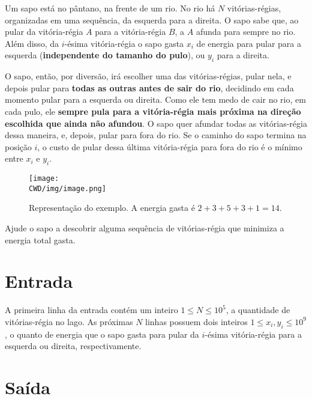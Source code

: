 %

Um sapo está no pântano, na frente de um rio. No rio há $N$ vitórias-régias, organizadas em uma sequência, da esquerda para a direita. O sapo sabe que, ao pular da vitória-régia $A$ para a vitória-régia $B$, a $A$ afunda para sempre no rio. Além disso, da $i$-ésima vitória-régia o sapo gasta $x_i$ de energia para pular para a esquerda (\textbf{independente do tamanho do pulo}), ou $y_i$ para a direita.

O sapo, então, por diversão, irá escolher uma das vitórias-régias, pular nela, e depois pular para \textbf{todas as outras antes de sair do rio}, decidindo em cada momento pular para a esquerda ou direita. Como ele tem medo de cair no rio, em cada pulo, ele \textbf{sempre pula para a vitória-régia mais próxima na direção escolhida que ainda não afundou}. O sapo quer afundar todas as vitórias-régia dessa maneira, e, depois, pular para fora do rio. Se o caminho do sapo termina na posição $i$, o custo de pular dessa última vitória-régia para fora do rio é o mínimo entre $x_i$ e $y_i$.

\begin{figure}[H]
  \centering
  \texttt{[image: \\CWD/img/image.png]}
  \caption{Representação do exemplo. A energia gasta é $2+3+5+3+1=14$.}
\end{figure}

Ajude o sapo a descobrir alguma sequência de vitórias-régia que minimiza a energia total gasta.

%
%

\section*{Entrada}

A primeira linha da entrada contém um inteiro $1 \leq N \leq 10^5$, a quantidade de vitórias-régia no lago. As próximas $N$ linhas possuem dois inteiros $1 \leq x_i, y_i \leq 10^9$, o quanto de energia que o sapo gasta para pular da $i$-ésima vitória-régia para a esquerda ou direita, respectivamente.

%
%

\section*{Saída}


